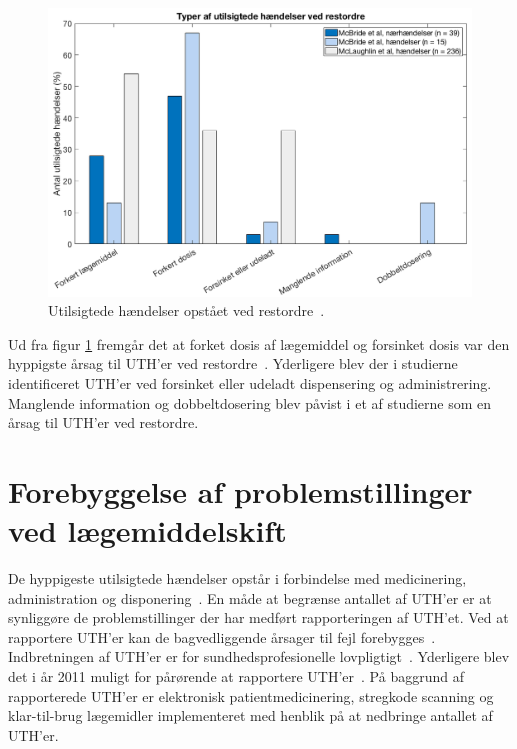 \begin{figure}[H]\centering
	\includegraphics[width=1\textwidth]{billeder/UTH2.png} 
	\caption{Utilsigtede hændelser opstået ved restordre~\citep{McLaughlin2013,McBride2013}.}
	\label{fig:UTHrestordre}  
\end{figure}

Ud fra figur \ref{fig:UTHrestordre} fremgår det at forket dosis af lægemiddel og forsinket dosis var den hyppigste årsag til UTH'er ved restordre~\citep{McLaughlin2013,McBride2013}. Yderligere blev der i studierne identificeret UTH'er ved forsinket eller udeladt dispensering og administrering. Manglende information og dobbeltdosering blev påvist i et af studierne som en årsag til UTH'er ved restordre.~\citep{McLaughlin2013,McBride2013}

\section{Forebyggelse af problemstillinger ved lægemiddelskift}
De hyppigeste utilsigtede hændelser opstår i forbindelse med medicinering, administration og disponering~\citep{Jensen2014}. 
En måde at begrænse antallet af UTH'er er at synliggøre de problemstillinger der har medført rapporteringen af UTH'et. Ved at rapportere UTH'er kan de bagvedliggende årsager til fejl forebygges~\citep{StyrelsenforPatientsikkerhed2017}. Indbretningen af UTH'er er for sundhedsprofesionelle lovpligtigt~\citep{Jensen2014}. Yderligere blev det i år 2011 muligt for pårørende at rapportere UTH'er~\citep{Jensen2014}. På baggrund af rapporterede UTH'er er elektronisk patientmedicinering, stregkode scanning og klar-til-brug lægemidler implementeret med henblik på at nedbringe antallet af UTH'er.

